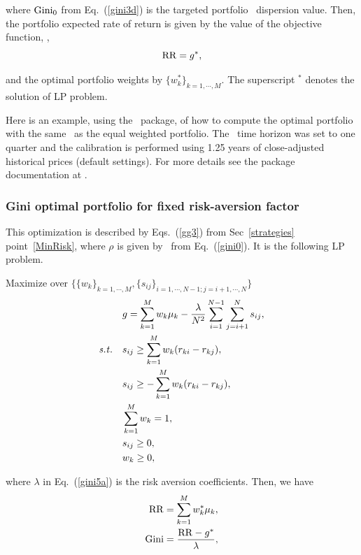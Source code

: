 \noindent where ${\rm Gini}_0$ from Eq.~(\ref{gini3d}) is the targeted portfolio \GINI\ dispersion value.
Then, the portfolio expected rate of return is given by the value of the objective
function, \ie,
\begin{equation}
    \RR = g^*, \label{gini4}
\end{equation}

\noindent and the optimal portfolio weights by $\{w^*_k\}_{k=1,\cdots,M}$. The superscript $^*$ denotes the
solution of LP problem.

\bigskip
\noindent Here is an example, using the \azapy\ package, of how to compute the optimal portfolio
with the same \GINI\ as the equal weighted portfolio.
The \GINI\ time horizon was set to one quarter and the calibration is performed using 1.25 years of
close-adjusted historical prices (default settings).
For more details see the package documentation at \azapydoc.



\BackToContents


\subsubsection{Gini optimal portfolio for fixed risk-aversion factor}
This optimization is described by Eqs.\ (\ref{gg3}) from Sec~\ref{strategies} point~\ref{MinRisk},
where $\rho$ is given by \GINI\ from Eq.\ (\ref{gini0}).
It is the following LP problem.

\bigskip
\noindent Maximize over $\{ \{w_k\}_{k=1,\cdots,M}, \{s_{ij}\}_{i=1,\cdots,N-1; j = i+1,\cdots,N} \}$
\begin{subequations}\label{gini5}
\begin{align}
    &g = \sum_{k=1}^M w_k \mu_k - \frac{\lambda}{N^2} \sum_{i=1}^{N-1} \sum_{j = i+1}^N s_{ij}, \label{gini5a} \\
    \st &s_{ij} \geq \sum_{k=1}^M w_k (r_{ki} - r_{kj}), \label{gini5b} \\
        &s_{ij} \geq -\sum_{k=1}^M w_k (r_{ki} - r_{kj}), \label{gini5c} \\
        & \sum_{k=1}^M w_k = 1, \label{gini5d} \\
        & s_{ij} \geq 0, \label{gini5f} \\
        & w_k \geq 0, \label{gini5e}
\end{align}
\end{subequations}

\noindent where $\lambda$ in Eq.\ (\ref{gini5a}) is the risk aversion coefficients.
Then, we have
\begin{subequations}\label{gini6}
\begin{align}
    \RR &= \sum_{k=1}^M w_k^* \mu_k, \label{gini6a} \\
    \GINI &= \frac{\RR - g^*}{\lambda}, \label{gini6b}
\end{align}
\end{subequations}

